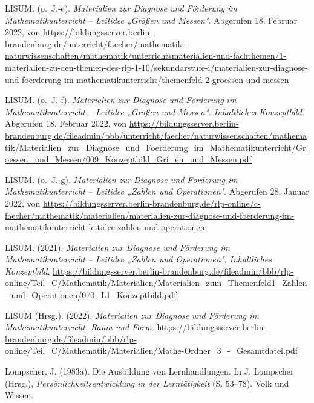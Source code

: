 \documentclass[
]{scrbook}
\newlength{\cslhangindent}
\newlength{\cslentryspacingunit} %
\newenvironment{CSLReferences}[2] %
 {%
  \setlength{\parindent}{0pt}
  \ifodd #1
  \let\oldpar\par
  \def\par{\hangindent=\cslhangindent\oldpar}
  \fi
  \setlength{\parskip}{#2\cslentryspacingunit}
 }%
 {}
\theoremstyle{definition}
\theoremstyle{definition}
\theoremstyle{definition}
\theoremstyle{definition}
\theoremstyle{remark}
\begin{document}
\begin{CSLReferences}{1}{0}
\leavevmode{}%
LISUM. (o.~J.-e). \emph{Materialien zur {Diagnose} und {Förderung} im {Mathematikunterricht} -- {Leitidee} „{Größen} und {Messen}"}. Abgerufen 18. Februar 2022, von \url{https://bildungsserver.berlin-brandenburg.de/unterricht/faecher/mathematik-naturwissenschaften/mathematik/unterrichtsmaterialien-und-fachthemen/1-materialien-zu-den-themen-des-rlp-1-10/sekundarstufe-i/materialien-zur-diagnose-und-foerderung-im-mathematikunterricht/themenfeld-2-groessen-und-messen}

\leavevmode{}%
LISUM. (o.~J.-f). \emph{Materialien zur {Diagnose} und {Förderung} im {Mathematikunterricht} -- {Leitidee} „{Größen} und {Messen}". {Inhaltliches} {Konzeptbild}}. Abgerufen 18. Februar 2022, von \url{https://bildungsserver.berlin-brandenburg.de/fileadmin/bbb/unterricht/faecher/naturwissenschaften/mathematik/Materialien_zur_Diagnose_und_Foerderung_im_Mathematikunterricht/Groessen_und_Messen/009_Konzeptbild_Gri_en_und_Messen.pdf}

\leavevmode{}%
LISUM. (o.~J.-g). \emph{Materialien zur {Diagnose} und {Förderung} im {Mathematikunterricht} -- {Leitidee} „{Zahlen} und {Operationen}"}. Abgerufen 28. Januar 2022, von \url{https://bildungsserver.berlin-brandenburg.de/rlp-online/c-faecher/mathematik/materialien/materialien-zur-diagnose-und-foerderung-im-mathematikunterricht-leitidee-zahlen-und-operationen}

\leavevmode{}%
LISUM. (2021). \emph{Materialien zur {Diagnose} und {Förderung} im {Mathematikunterricht} -- {Leitidee} „{Zahlen} und {Operationen}". {Inhaltliches} {Konzeptbild}}. \url{https://bildungsserver.berlin-brandenburg.de/fileadmin/bbb/rlp-online/Teil_C/Mathematik/Materialien/Materialien_zum_Themenfeld1_Zahlen_und_Operationen/070_L1_Konzeptbild.pdf}

\leavevmode{}%
LISUM (Hrsg.). (2022). \emph{Materialien zur {Diagnose} und {Förderung} im {Mathematikunterricht}. {Raum} und {Form}}. \url{https://bildungsserver.berlin-brandenburg.de/fileadmin/bbb/rlp-online/Teil_C/Mathematik/Materialien/Mathe-Ordner_3_-_Gesamtdatei.pdf}

\leavevmode{}%
Lompscher, J. (1983a). Die {Ausbildung} von {Lernhandlungen}. In J. Lompscher (Hrsg.), \emph{Persönlichkeitsentwicklung in der {Lerntätigkeit}} (S. 53--78). Volk und Wissen.


\end{CSLReferences}
\end{document}
